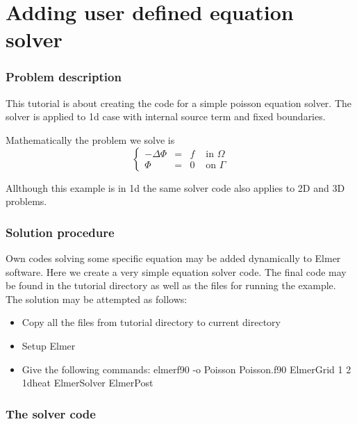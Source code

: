 \chapter{Adding user defined equation solver}


\subsection*{Problem description}

This tutorial is about creating the code for a simple poisson equation solver.
The solver is applied to 1d case with internal source term and fixed boundaries.

Mathematically the problem we solve is
\begin{equation}
\left \{
\begin{array}{cccc}
- \Delta \Phi &= &f & \mbox{ in } \Omega \\
\Phi&=&0 & \mbox{ on } \Gamma
\end{array}
\right .
\end{equation}

Allthough this example is in 1d the same solver code also applies to 2D and 3D
problems.

\subsection*{Solution procedure}

Own codes solving some specific equation may be added dynamically to Elmer 
software. Here we create a very simple equation solver code. The final code
may be found in the tutorial directory as well as the files for running
the example. The solution may be attempted as follows:

\begin{itemize}
\item Copy all the files from tutorial directory to current directory
\item Setup Elmer
\item Give the following commands:
\ttbegin
elmerf90 -o Poisson Poisson.f90
ElmerGrid 1 2 1dheat
ElmerSolver
ElmerPost
\ttend
\end{itemize}

\subsection*{The solver code}

